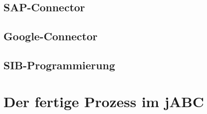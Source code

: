 




\subsection{SAP-Connector}


\subsection{Google-Connector}




\subsection{SIB-Programmierung}


\section{Der fertige Prozess im jABC}
\label{sec:jabc}










